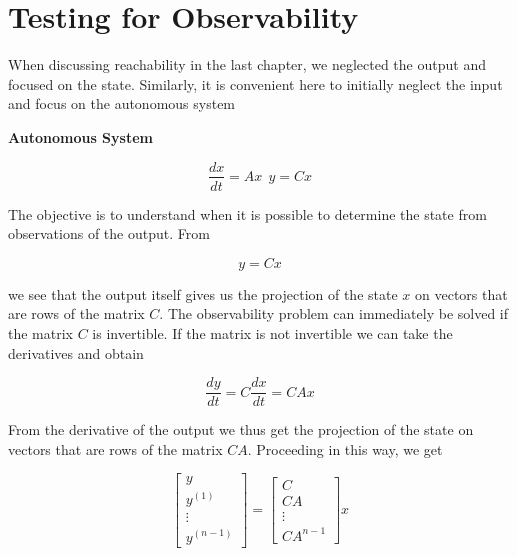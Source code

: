 \section{Testing for Observability}
\label{test_observability}

When discussing reachability in the last chapter, we neglected the output and focused on the state. Similarly, it is convenient here to initially neglect the input and
focus on the autonomous system



\begin{framed}
\theoremstyle{remark}
\begin{remark}{\textbf{Autonomous System}}

\end{remark}
\end{framed}

\begin{equation}
\frac{dx}{dt} = Ax ~~ y = Cx
\end{equation}

The objective is to understand when it is possible to determine the state from observations of the output. From

\begin{equation}
y = Cx
\end{equation}

we see that the output itself gives us the projection of the state $x$ on vectors that are rows of the matrix $C$. The 
observability problem can  immediately be solved if the matrix $C$ is invertible. If the matrix is not invertible we can take the derivatives and obtain

 
\begin{equation}
\frac{dy}{dt} = C\frac{dx}{dt} = CAx
\end{equation}

From the derivative of the output we thus get the projection of the state on vectors that are rows of the matrix $CA$. Proceeding in this way, we get


\begin{equation}
\begin{bmatrix}
 y \\
 y^{(1)} \\
 \vdots \\
 y^{(n-1)} 
\end{bmatrix} = 
\begin{bmatrix}
 C \\
 CA \\
 \vdots \\
 CA^{n-1} 
\end{bmatrix}x
\end{equation}

